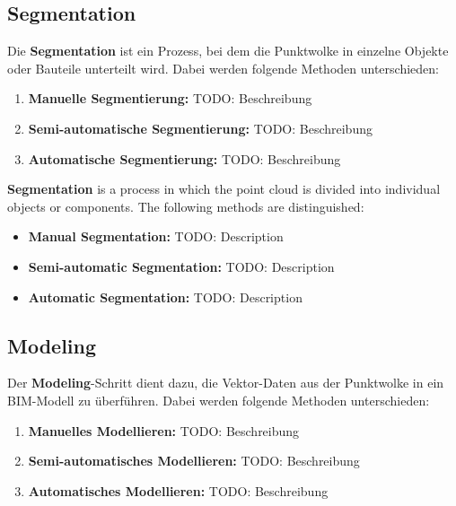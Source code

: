 \subsection{Segmentation}
\begin{German}
    Die \textbf{Segmentation} ist ein Prozess, bei dem die Punktwolke in einzelne Objekte oder Bauteile unterteilt wird. Dabei werden folgende Methoden unterschieden:

    \begin{enumerate}
        \item \textbf{Manuelle Segmentierung:} TODO: Beschreibung
        \item \textbf{Semi-automatische Segmentierung:} TODO: Beschreibung
        \item \textbf{Automatische Segmentierung:} TODO: Beschreibung
    \end{enumerate}
\end{German}

\begin{English}
    \textbf{Segmentation} is a process in which the point cloud is divided into individual objects or components. The following methods are distinguished:

    \begin{itemize}
        \item \textbf{Manual Segmentation:} TODO: Description
        \item \textbf{Semi-automatic Segmentation:} TODO: Description
        \item \textbf{Automatic Segmentation:} TODO: Description
    \end{itemize}
\end{English}

\subsection{Modeling}
\begin{German}
    Der \textbf{Modeling}-Schritt dient dazu, die Vektor-Daten aus der Punktwolke in ein BIM-Modell zu überführen. Dabei werden folgende Methoden unterschieden:

    \begin{enumerate}
        \item \textbf{Manuelles Modellieren:} TODO: Beschreibung
        \item \textbf{Semi-automatisches Modellieren:} TODO: Beschreibung
        \item \textbf{Automatisches Modellieren:} TODO: Beschreibung
    \end{enumerate}
\end{German}

